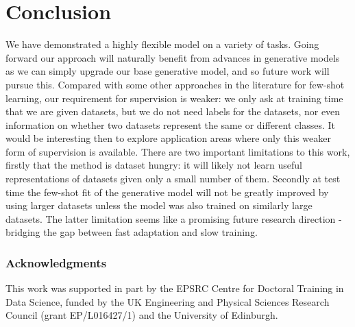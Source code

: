 \documentclass{article} \usepackage{iclr2017_conference,times}
\begin{document}
\section{Conclusion}
We have demonstrated a highly flexible model on a variety of tasks. Going forward our approach will naturally benefit from advances in generative models as we can simply upgrade our base generative model, and so future work will pursue this. Compared with some other approaches in the literature for few-shot learning, our requirement for supervision is weaker: we only ask at training time that we are given datasets, but we do not need labels for the datasets, nor even information on whether two datasets represent the same or different classes. It would be interesting then to explore application areas where only this weaker form of supervision is available. There are two important limitations to this work, firstly that the method is dataset hungry: it will likely not learn useful representations of datasets given only a small number of them. Secondly at test time the few-shot fit of the generative model will not be greatly improved by using larger datasets unless the model was also trained on similarly large datasets. The latter limitation seems like a promising future research direction - bridging the gap between fast adaptation and slow training. 
\subsubsection*{Acknowledgments}
This work was supported in part by the EPSRC Centre for Doctoral Training in Data Science, funded by the UK Engineering and Physical Sciences Research Council (grant EP/L016427/1) and the University of Edinburgh.



\appendix
\end{document}
